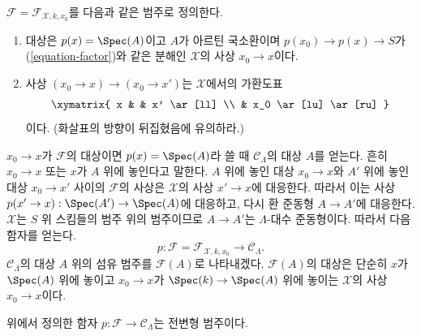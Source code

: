 \medskip\noindent
$\mathcal{F} = \mathcal{F}_{\mathcal{X}, k, x_0}$를 다음과 같은 범주로
정의한다.
\begin{enumerate}
\item 대상은 $p(x) = \Spec(A)$이고 $A$가 아르틴 국소환이며
$p(x_0) \to p(x) \to S$가 (\ref{equation-factor})와 같은 분해인
$\mathcal{X}$의 사상 $x_0 \to x$이다.
\item 사상 $(x_0 \to x) \to (x_0 \to x')$는 $\mathcal{X}$에서의
가환도표
$$
\xymatrix{
x & & x' \ar[ll] \\
& x_0 \ar[lu] \ar[ru]
}
$$
이다. (화살표의 방향이 뒤집혔음에 유의하라.)
\end{enumerate}
$x_0 \to x$가 $\mathcal{F}$의 대상이면 $p(x) = \Spec(A)$라 쓸 때
$\mathcal{C}_\Lambda$의 대상 $A$를 얻는다. 흔히 $x_0 \to x$ 또는 $x$가
$A$ 위에 놓인다고 말한다. $A$ 위에 놓인 대상 $x_0 \to x$와 $A'$ 위에
놓인 대상 $x_0 \to x'$ 사이의 $\mathcal{F}$의 사상은
$\mathcal{X}$의 사상 $x' \to x$에 대응한다. 따라서 이는 사상
$p(x' \to x) : \Spec(A') \to \Spec(A)$에 대응하고, 다시 환 준동형
$A \to A'$에 대응한다. $\mathcal{X}$는 $S$ 위 스킴들의 범주 위의
범주이므로 $A \to A'$는 $\Lambda$-대수 준동형이다.
따라서 다음 함자를 얻는다.
\begin{equation}
\label{equation-predeformation-category}
p : \mathcal{F} = \mathcal{F}_{\mathcal{X}, k, x_0}
\longrightarrow
\mathcal{C}_\Lambda.
\end{equation}
$\mathcal{C}_\Lambda$의 대상 $A$ 위의 섬유 범주를
$\mathcal{F}(A)$로 나타내겠다. $\mathcal{F}(A)$의 대상은 단순히
$x$가 $\Spec(A)$ 위에 놓이고 $x_0 \to x$가
$\Spec(k) \to \Spec(A)$ 위에 놓이는 $\mathcal{X}$의 사상
$x_0 \to x$이다.

\begin{lemma}
\label{lemma-predeformation-category}
위에서 정의한 함자 $p : \mathcal{F} \to \mathcal{C}_\Lambda$는
전변형 범주이다.
\end{lemma}


